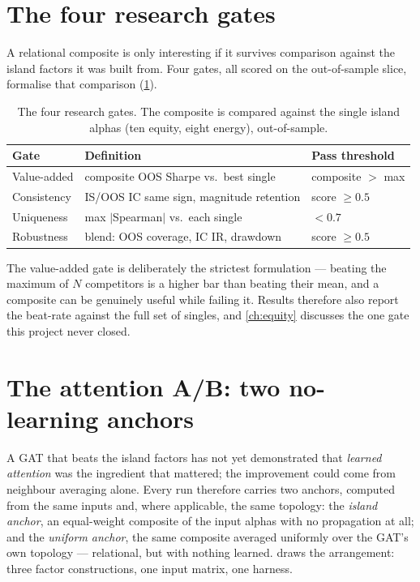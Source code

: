 \section{The four research gates}
\label{sec:gates}

A relational composite is only interesting if it survives comparison
against the island factors it was built from. Four gates, all scored on
the out-of-sample slice, formalise that comparison
(\cref{tab:gates}).

\begin{table}[htbp]
  \centering
  \caption{The four research gates. The composite is compared against
  the single island alphas (ten equity, eight energy), out-of-sample.}
  \label{tab:gates}
  \begin{tabular}{lll}
    \toprule
    Gate & Definition & Pass threshold \\
    \midrule
    Value-added & composite OOS Sharpe vs.\ best single & composite $>$ max \\
    Consistency & IS/OOS IC same sign, magnitude retention & score $\geq 0.5$ \\
    Uniqueness  & max $|$Spearman$|$ vs.\ each single & $< 0.7$ \\
    Robustness  & blend: OOS coverage, IC IR, drawdown & score $\geq 0.5$ \\
    \bottomrule
  \end{tabular}
\end{table}

The value-added gate is deliberately the strictest formulation ---
beating the maximum of $N$ competitors is a higher bar than beating their
mean, and a composite can be genuinely useful while failing it. Results
therefore also report the beat-rate against the full set of singles, and
\cref{ch:equity} discusses the one gate this project never closed.

\section{The attention A/B: two no-learning anchors}
\label{sec:anchors}

A GAT that beats the island factors has not yet demonstrated that
\emph{learned attention} was the ingredient that mattered; the
improvement could come from neighbour averaging alone. Every run
therefore carries two anchors, computed from the same inputs and, where
applicable, the same topology: the \emph{island anchor}, an equal-weight
composite of the input alphas with no propagation at all; and the
\emph{uniform anchor}, the same composite averaged uniformly over the
GAT's own topology --- relational, but with nothing learned.
 draws the arrangement: three factor
constructions, one input matrix, one harness.

